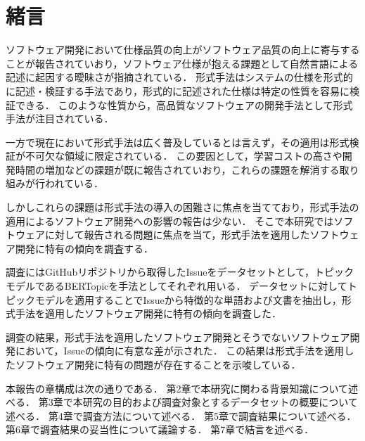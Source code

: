 \documentclass[main]{subfiles}
\begin{document}
\chapter{緒言}

ソフトウェア開発において仕様品質の向上がソフトウェア品質の向上に寄与することが報告されていおり\cite{knauss:2009}，ソフトウェア仕様が抱える課題として自然言語による記述に起因する曖昧さが指摘されている\cite{kamsties:2005}．
形式手法はシステムの仕様を形式的に記述・検証する手法であり，形式的に記述された仕様は特定の性質を容易に検証できる．
このような性質から，高品質なソフトウェアの開発手法として形式手法が注目されている\cite{aoki:2018}．

一方で現在において形式手法は広く普及しているとは言えず，その適用は形式検証が不可欠な領域に限定されている．
この要因として，学習コストの高さや開発時間の増加などの課題が既に報告されていおり\cite{reid:2020,kitamura:2021}，これらの課題を解消する取り組みが行われている\cite{huisman:2020,ohnishi:2020}．

しかしこれらの課題は形式手法の導入の困難さに焦点を当てており，形式手法の適用によるソフトウェア開発への影響の報告は少ない．
そこで本研究ではソフトウェアに対して報告される問題に焦点を当て，形式手法を適用したソフトウェア開発に特有の傾向を調査する．

調査にはGitHubリポジトリから取得したIssueをデータセットとして，トピックモデルであるBERTopic\cite{grootendorst:2022}を手法としてそれぞれ用いる．
データセットに対してトピックモデルを適用することでIssueから特徴的な単語および文書を抽出し，形式手法を適用したソフトウェア開発に特有の傾向を調査した．

調査の結果，形式手法を適用したソフトウェア開発とそうでないソフトウェア開発において，Issueの傾向に有意な差が示された．
この結果は形式手法を適用したソフトウェア開発に特有の問題が存在することを示唆している．

本報告の章構成は次の通りである．
第2章で本研究に関わる背景知識について述べる．
第3章で本研究の目的および調査対象とするデータセットの概要について述べる．
第4章で調査方法について述べる．
第5章で調査結果について述べる．
第6章で調査結果の妥当性について議論する．
第7章で結言を述べる．
\end{document}
